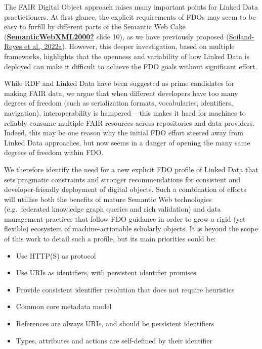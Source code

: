 The FAIR Digital Object approach raises many important points for Linked
Data practictioners. At first glance, the explicit requirements of FDOs
may seem to be easy to furfill by different parts of the Semantic Web
Cake (\protect\hyperlink{ref-SemanticWebXML2000}{\textbf{SemanticWebXML2000?}} slide 10), as we have previously proposed
(\protect\hyperlink{ref-eBBPb4Yf}{Soiland-Reyes et al., 2022a}). However, this deeper investigation, based on
multiple frameworks, highlights that the openness and variability of how
Linked Data is deployed can make it difficult to achieve the FDO goals
without significant effort.

While RDF and Linked Data have been suggested as prime candidates for
making FAIR data, we argue that when different developers have too many
degrees of freedom (such as serialization formats, vocabularies,
identifiers, navigation), interoperability is hampered -- this makes it
hard for machines to reliably consume multiple FAIR resources across
repositories and data providers. Indeed, this may be one reason why the
initial FDO effort steered away from Linked Data approaches, but now
seems in a danger of opening the many same degrees of freedom within
FDO.

We therefore identify the need for a new explicit FDO profile of Linked
Data that sets pragmatic constraints and stronger recommendations for
consistent and developer-friendly deployment of digital objects. Such a
combination of efforts will utillise both the benefits of mature
Semantic Web technologies (e.g.~federated knowledge graph queries and
rich validation) and data management practices that follow FDO guidance
in order to grow a rigid (yet flexible) ecosystem of machine-actionable
scholarly objects. It is beyond the scope of this work to detail such a
profile, but its main priorities could be:

\begin{itemize}
\tightlist
\item
  Use HTTP(S) as protocol
\item
  Use URIs as identifiers, with persistent identifier promises
\item
  Provide consistent identifier resolution that does not require
  heuristics
\item
  Common core metadata model
\item
  References are always URIs, and should be persistent identifiers
\item
  Types, attributes and actions are self-defined by their identifier
\end{itemize}

